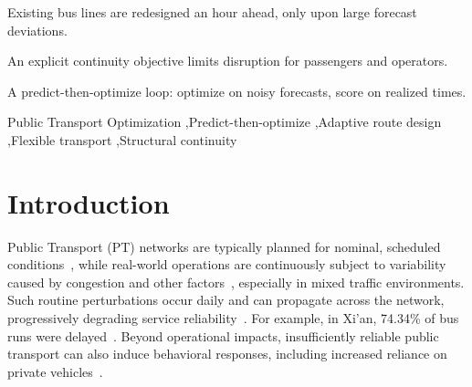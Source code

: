 \documentclass[a4paper,fleqn]{cas-sc}
\begin{document}

\begin{highlights}
\item Existing bus lines are redesigned an hour ahead, only upon large forecast deviations.
\item An explicit continuity objective limits disruption for passengers and operators.
\item A predict-then-optimize loop: optimize on noisy forecasts, score on realized times.
\end{highlights}


\begin{keywords}
Public Transport Optimization \sep Predict-then-optimize \sep Adaptive route design \sep Flexible transport \sep Structural continuity
\end{keywords}

\maketitle

\section{Introduction}

Public Transport (PT) networks are typically planned for nominal, scheduled conditions~\citep{ibarra2015planning}, while real-world operations are continuously subject to variability caused by congestion and other factors~\citep{buchel2020review, danaher2020minutes}, especially in mixed traffic environments. Such routine perturbations occur daily and can propagate across the network, progressively degrading service reliability~\citep{marra2020delay}. For example, in Xi’an, 74.34\% of bus runs were delayed~\citep{zhang2022travel}. 
Beyond operational impacts, insufficiently reliable public transport can also induce behavioral responses, including increased reliance on private vehicles~\citep{rodier2025evaluation}.
\end{document}
